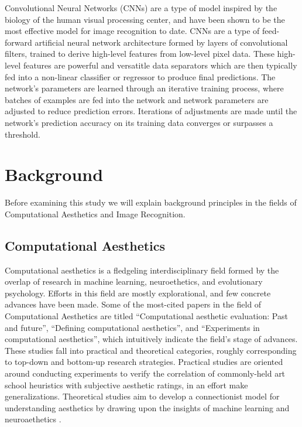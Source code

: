 \documentclass[midd]{thesis}
\begin{document}
Convolutional Neural Networks (CNNs) are a type of model inspired by the biology of the human visual processing center, and have been shown to be the most effective model for image recognition to date.
CNNs are a type of feed-forward artificial neural network architecture formed by layers of convolutional filters, trained to derive high-level features from low-level pixel data. These high-level features are powerful and versatitle data separators which are then typically fed into a non-linear classifier or regressor to produce final predictions. The network's parameters are learned through an iterative training process, where batches of examples are fed into the network and network parameters are adjusted to reduce prediction errors. Iterations of adjustments are made until the network's prediction accuracy on its training data converges or surpasses a threshold.
























\chapter{Background}
Before examining this study we will explain background principles in the fields of Computational Aesthetics and Image Recognition.

\section{Computational Aesthetics}
Computational aesthetics is a fledgeling interdisciplinary field formed by the overlap of research in machine learning, neuroethetics, and evolutionary psychology. Efforts in this field are mostly explorational, and few concrete advances have been made. Some of the most-cited papers in the field of Computational Aesthetics are titled ``Computational aesthetic evaluation: Past and future'', ``Defining computational aesthetics'', and ``Experiments in computational aesthetics'', which intuitively indicate the field's stage of advances. These studies fall into practical and theoretical categories, roughly corresponding to top-down and bottom-up research strategies. Practical studies are oriented around conducting experiments to verify the correlation of commonly-held art school heuristics with subjective aesthetic ratings, in an effort make generalizations. Theoretical studies aim to develop a connectionist model for understanding aesthetics by drawing upon the insights of machine learning and neuroaethetics \cite{galanter2012computational, hoenig2005defining, machado2008experiments}.
\end{document}
